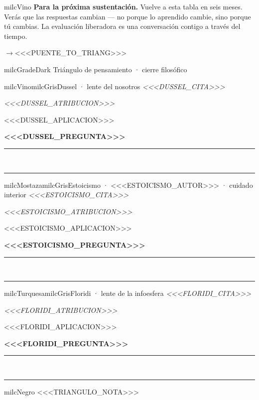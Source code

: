 \documentclass[11pt,letterpaper]{article}
\newcommand{\puente}[1]{%
  \begin{puentebox}%
    \textcolor{milcGradeDark}{$\rightarrow$}\hspace{2mm}#1%
  \end{puentebox}%
}
\newcommand{\linead}[1]{\noindent\color{milcLinea}\rule{#1}{0.5pt}\color{milcNegro}}
\begin{document}
\begin{infoband}{milcVino}
\textbf{Para la próxima sustentación.} Vuelve a esta tabla en seis meses. Verás que las respuestas cambian — no porque lo aprendido cambie, sino porque tú cambias. La evaluación liberadora es una conversación contigo a través del tiempo.
\end{infoband}


\puente{<<<PUENTE_TO_TRIANG>>>}

\begin{titlebox}{milcGradeDark}
Triángulo de pensamiento · cierre filosófico
\end{titlebox}

\begin{softbox}{milcVino}{milcGris}{Dussel · lente del nosotros}
\textit{<<<DUSSEL_CITA>>>}

{\footnotesize\itshape\color{milcNegro!70}<<<DUSSEL_ATRIBUCION>>>}

<<<DUSSEL_APLICACION>>>

\textbf{<<<DUSSEL_PREGUNTA>>>}
\end{softbox}
\linead{\linewidth}\\[1mm]
\linead{\linewidth}

\begin{softbox}{milcMostaza}{milcGris}{Estoicismo · <<<ESTOICISMO_AUTOR>>> · cuidado interior}
\textit{<<<ESTOICISMO_CITA>>>}

{\footnotesize\itshape\color{milcNegro!70}<<<ESTOICISMO_ATRIBUCION>>>}

<<<ESTOICISMO_APLICACION>>>

\textbf{<<<ESTOICISMO_PREGUNTA>>>}
\end{softbox}
\linead{\linewidth}\\[1mm]
\linead{\linewidth}

\begin{softbox}{milcTurquesa}{milcGris}{Floridi · lente de la infoesfera}
\textit{<<<FLORIDI_CITA>>>}

{\footnotesize\itshape\color{milcNegro!70}<<<FLORIDI_ATRIBUCION>>>}

<<<FLORIDI_APLICACION>>>

\textbf{<<<FLORIDI_PREGUNTA>>>}
\end{softbox}
\linead{\linewidth}\\[1mm]
\linead{\linewidth}

\begin{infoband}{milcNegro}
<<<TRIANGULO_NOTA>>>
\end{infoband}
\end{document}

